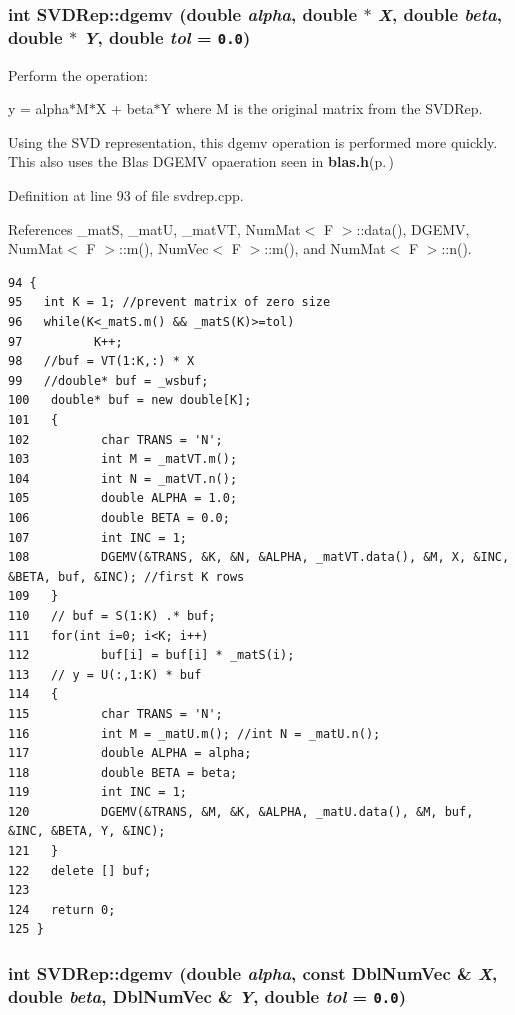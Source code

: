 \subsubsection{\setlength{\rightskip}{0pt plus 5cm}int SVDRep::dgemv (double {\em alpha}, double $\ast$ {\em X}, double {\em beta}, double $\ast$ {\em Y}, double {\em tol} = {\tt 0.0})}\label{classSVDRep_00a3b0d1ee40ea4c0a4a87d575249f81_00a3b0d1ee40ea4c0a4a87d575249f81}


Perform the operation:

y = alpha$\ast$M$\ast$X + beta$\ast$Y where M is the original matrix from the SVDRep.

Using the SVD representation, this dgemv operation is performed more quickly. This also uses the Blas DGEMV opaeration seen in {\bf blas.h}{\rm (p.\,\pageref{blas_8h})} 

Definition at line 93 of file svdrep.cpp.

References \_\-mat\-S, \_\-mat\-U, \_\-mat\-VT, Num\-Mat$<$ F $>$::data(), DGEMV, Num\-Mat$<$ F $>$::m(), Num\-Vec$<$ F $>$::m(), and Num\-Mat$<$ F $>$::n().

\footnotesize\begin{verbatim}94 {
95   int K = 1; //prevent matrix of zero size
96   while(K<_matS.m() && _matS(K)>=tol) 
97          K++;
98   //buf = VT(1:K,:) * X
99   //double* buf = _wsbuf;
100   double* buf = new double[K];
101   {
102          char TRANS = 'N';
103          int M = _matVT.m();
104          int N = _matVT.n();
105          double ALPHA = 1.0;
106          double BETA = 0.0;
107          int INC = 1;
108          DGEMV(&TRANS, &K, &N, &ALPHA, _matVT.data(), &M, X, &INC, &BETA, buf, &INC); //first K rows
109   }
110   // buf = S(1:K) .* buf;
111   for(int i=0; i<K; i++)
112          buf[i] = buf[i] * _matS(i);
113   // y = U(:,1:K) * buf
114   {
115          char TRANS = 'N';
116          int M = _matU.m(); //int N = _matU.n();
117          double ALPHA = alpha;
118          double BETA = beta;
119          int INC = 1;
120          DGEMV(&TRANS, &M, &K, &ALPHA, _matU.data(), &M, buf, &INC, &BETA, Y, &INC);    
121   }
122   delete [] buf;
123   
124   return 0;
125 }
\end{verbatim}\normalsize 


\subsubsection{\setlength{\rightskip}{0pt plus 5cm}int SVDRep::dgemv (double {\em alpha}, const {\bf Dbl\-Num\-Vec} \& {\em X}, double {\em beta}, {\bf Dbl\-Num\-Vec} \& {\em Y}, double {\em tol} = {\tt 0.0})}\label{classSVDRep_dc2736f382b2777886e8d2fe6b6a6b4c_dc2736f382b2777886e8d2fe6b6a6b4c}


